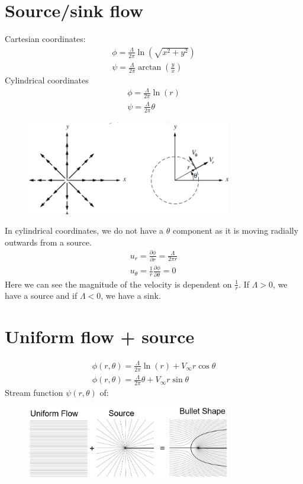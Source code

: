 \documentclass[class=report, crop=false, 12pt,a4paper]{standalone}
\begin{document}
\section{Source/sink flow}
Cartesian coordinates:
\begin{gather}
  \phi = \frac{\Lambda}{2\pi} \ln(\sqrt{x^2 +y^2})\\
  \psi = \frac{\Lambda}{2\pi}\arctan\left(\frac{y}{x}\right)
\end{gather}
Cylindrical coordinates
\begin{gather}
  \phi = \frac{\Lambda}{2\pi}\ln(r)\\
  \psi = \frac{\Lambda}{2\pi}\theta
\end{gather}
\begin{figure}[H]
  \centering
  \includegraphics[width = 0.8\textwidth]{../img/diagram18.png}
\end{figure}
In cylindrical coordinates, we do not have a $\theta$ component as it is moving radially outwards from a source.
\begin{gather}
  u_r = \frac{\partial \phi}{\partial r} = \frac{\Lambda}{2\pi r}\\
  u_{\theta} = \frac{1}{r} \frac{\partial \phi}{\partial \theta} = 0
\end{gather}
Here we can see the magnitude of the velocity is dependent on $\frac{1}{r}$. If $\Lambda > 0$, we have a source and if $\Lambda < 0$, we have a sink.
\section{Uniform flow + source}
\begin{gather}
  \phi (r,\theta) = \frac{\Lambda}{2\pi} \ln(r) + V_{\infty} r \cos \theta \\
  \phi (r,\theta) = \frac{\Lambda}{2\pi}\theta + V_{\infty} r \sin \theta
\end{gather}
Stream function $\psi (r,\theta)$ of:
\begin{figure}[H]
  \centering
  \includegraphics[width = 0.8\textwidth]{../img/diagram19.png}
\end{figure}
\end{document}
